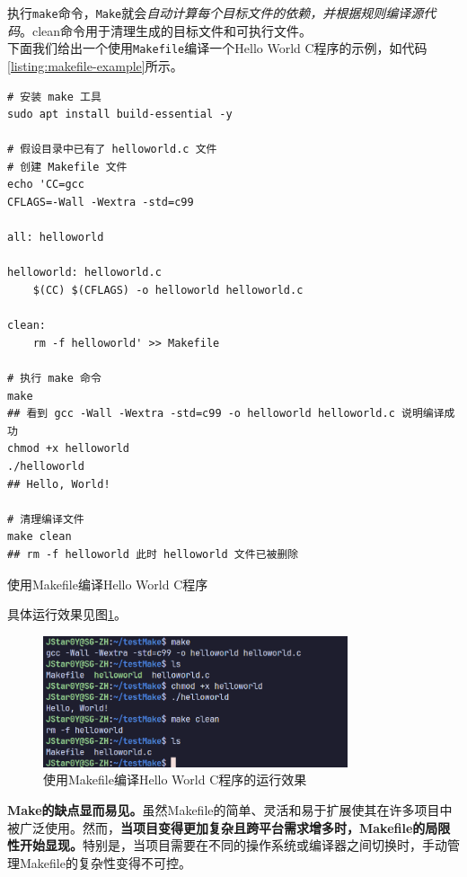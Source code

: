 执行\texttt{make}命令，\texttt{Make}就会\textit{自动计算每个目标文件的依赖，并根据规则编译源代码}。clean命令用于清理生成的目标文件和可执行文件。\\

下面我们给出一个使用\texttt{Makefile}编译一个Hello World C程序的示例，如代码\ref{listing:makefile-example}所示。

\begin{longlisting}
    \begin{verbatim}
# 安装 make 工具
sudo apt install build-essential -y

# 假设目录中已有了 helloworld.c 文件
# 创建 Makefile 文件
echo 'CC=gcc
CFLAGS=-Wall -Wextra -std=c99

all: helloworld

helloworld: helloworld.c
	$(CC) $(CFLAGS) -o helloworld helloworld.c

clean:
	rm -f helloworld' >> Makefile

# 执行 make 命令
make
## 看到 gcc -Wall -Wextra -std=c99 -o helloworld helloworld.c 说明编译成功
chmod +x helloworld
./helloworld
## Hello, World!

# 清理编译文件
make clean
## rm -f helloworld 此时 helloworld 文件已被删除
    \end{verbatim}
    \caption{使用Makefile编译Hello World C程序}
    \label{listing:makefile-example}
\end{longlisting}

具体运行效果见图\ref{fig:makefile-example}。\\

\begin{figure}[!htbp]
    \centering
    \includegraphics[width=0.8\textwidth]{Figures/make.png}
    \caption{使用Makefile编译Hello World C程序的运行效果}
    \label{fig:makefile-example}
\end{figure}

\textbf{Make的缺点显而易见。}虽然Makefile的简单、灵活和易于扩展使其在许多项目中被广泛使用。然而，\textbf{当项目变得更加复杂且跨平台需求增多时，Makefile的局限性开始显现。}特别是，当项目需要在不同的操作系统或编译器之间切换时，手动管理Makefile的复杂性变得不可控。